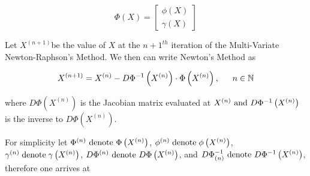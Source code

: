 \begin{equation} \label{ZEqnNum407215} \Phi
\left(X\right)=\left[\begin{array}{c} {\phi \left(X\right)} \\ {\gamma
\left(X\right)} \end{array} \right] \end{equation}

Let $X^{(n+1)} $be the value of $X$ at the $n+1^{th} $ iteration of the
Multi-Variate Newton-Raphson's Method. We then can write Newton's Method as

\begin{equation} \label{4.5)} X^{\left(n+1\right)} =X^{\left(n\right)} -D\Phi
^{-1} \left(X^{\left(n\right)} \right)\cdot \Phi \left(X^{\left(n\right)}
\right), \text{ \; \; } n\in {\mathbb N} \end{equation}

where $D\Phi \left(X^{\left(n\right)} \right)$ is the Jacobian matrix evaluated
at $X^{\left(n\right)} \text{ and } D\Phi ^{-1} \left(X^{\left(n\right)} \right)$ is
the inverse to $D\Phi \left(X^{\left(n\right)} \right)$.

For simplicity let $\Phi ^{\left(n\right)} \text{ denote } \Phi
\left(X^{\left(n\right)} \right)$, $\phi ^{\left(n\right)} {\rm \; denote\;
} \phi \left(X^{\left(n\right)} \right)$, $\gamma ^{\left(n\right)} {\rm \;
denote\; } \gamma \left(X^{\left(n\right)} \right)$, $D\Phi ^{\left(n\right)}
\text{ denote }D\Phi \left(X^{\left(n\right)} \right)$, and $D\Phi
_{\left(n\right)}^{-1} \text{ denote }D\Phi ^{-1} \left(X^{\left(n\right)}
\right)$, therefore one arrives at

